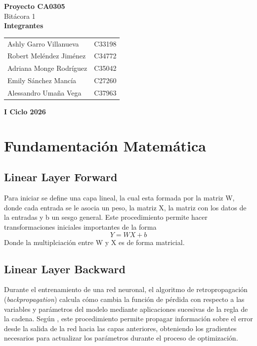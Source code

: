 \documentclass[12pt]{article}
\begin{document}
\begin{titlepage}
\centering

\vspace*{\fill}
{\Large \textbf{Proyecto CA0305}} \\
{\large Bitácora 1} \\
\vspace{2cm}
{\large \textbf{Integrantes}} \\
\vspace{1cm}
\begin{tabular}{p{6cm} p{2cm}}
Ashly Garro Villanueva & C33198 \\
Robert Meléndez Jiménez & C34772 \\
Adriana Monge Rodríguez & C35042 \\
Emily Sánchez Mancía & C27260 \\
Alessandro Umaña Vega & C37963 \\
\end{tabular}

\vspace{2cm}

{\large \textbf{I Ciclo 2026}}
\vspace*{\fill}

\end{titlepage}
\tableofcontents
\newpage

\section{Fundamentación Matemática}
\subsection{Linear Layer Forward}
Para iniciar se define una capa lineal, la cual esta formada por la matriz W, donde cada entrada se le asocia un peso, la matriz X, 
la matriz con los datos de la entradas y b un sesgo general. Este procedimiento permite hacer transformaciones iniciales importantes 
de la forma 
$$
Y = WX + b
$$
Donde la multiplciación entre W y X es de forma matricial.

\subsection{Linear Layer Backward}
Durante el entrenamiento de una red neuronal, el algoritmo de retropropagación (\textit{backpropagation}) 
calcula cómo cambia la función de pérdida con respecto a las variables y parámetros del modelo mediante 
aplicaciones sucesivas de la regla de la cadena. Según \textcite{Goodfellow2016}, este procedimiento 
permite propagar información sobre el error desde la salida de la red hacia las capas anteriores, 
obteniendo los gradientes necesarios para actualizar los parámetros durante el proceso de optimización.
\end{document}
